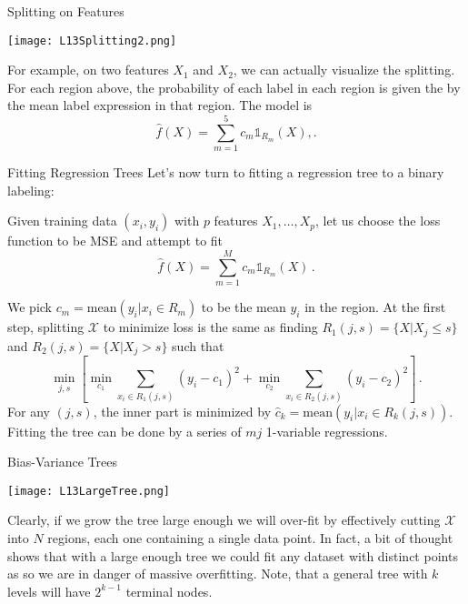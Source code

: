 \documentclass[10pt, table, dvipsnames,xcdraw]{beamer}
\newcommand{\cX}{\ensuremath{\mathcal{X}}}
\begin{document}
\begin{frame}[fragile]{Splitting on Features}
  \begin{minipage}[t][0.5\textheight][t]{\textwidth}
	\centering \texttt{[image: L13Splitting2.png]} 
  \end{minipage}
  \vfill
\begin{minipage}[t][0.5\textheight][t]{\textwidth}
For example, on two features $X_1$ and $X_2$, we can actually visualize the splitting. For each region above, the probability of each label in each region is given the by the mean label expression in that region. \pause The model is 
$$
\hat{f}(X)= \sum_{m=1}^5 c_m  \mathds{1}_{R_m}(X),.
$$
\end{minipage}
\end{frame}



\begin{frame}[fragile]{Fitting Regression Trees}
Let's now turn to fitting a regression tree to a binary labeling:\newline

Given training data $(x_i, y_i)$ with $p$ features $X_1,\ldots, X_p$, let us choose the loss function to be MSE and attempt to fit
$$
\hat{f}(X)= \sum_{m=1}^M c_m  \mathds{1}_{R_m}(X)\,.
$$ \pause 

We pick $c_m = \text{mean}(y_i|x_i\in R_m)$ to be the mean $y_i$ in the region. \pause At the first step, splitting $\mathcal{X}$ to minimize loss is the same as finding $R_1(j,s) = \{X|X_j\leq s\}$ and $R_2(j,s)=\{X|X_j>s\}$ such that 
$$
\min_{j,s}\left[ \min_{c_1} \sum_{x_i\in R_1(j,s)} (y_i-c_1)^2 + \min_{c_2} \sum_{x_i\in R_2(j,s)} (y_i-c_2)^2\right]\,.
$$\pause 
For any $(j,s)$, the inner part is minimized by $\hat c_k = \text{mean}(y_i|x_i\in R_k(j,s))$. Fitting the tree can be done by a series of $mj$ 1-variable regressions.
\end{frame}


\begin{frame}[fragile]{Bias-Variance Trees}
  \begin{minipage}[t][0.5\textheight][t]{\textwidth}
	\centering \texttt{[image: L13LargeTree.png]} 
  \end{minipage}
  \vfill
\begin{minipage}[t][0.5\textheight][t]{\textwidth}
Clearly, if we grow the tree large enough we will over-fit by effectively cutting $\cX$ into $N$ regions, each one containing a single data point. \pause In fact, a bit of thought shows that with a large enough tree we could fit any dataset with distinct points as so we are in danger of massive overfitting. Note, that a general tree with $k$ levels will have $2^{k-1}$ terminal nodes. 
\end{minipage}
\end{frame}
\end{document}
